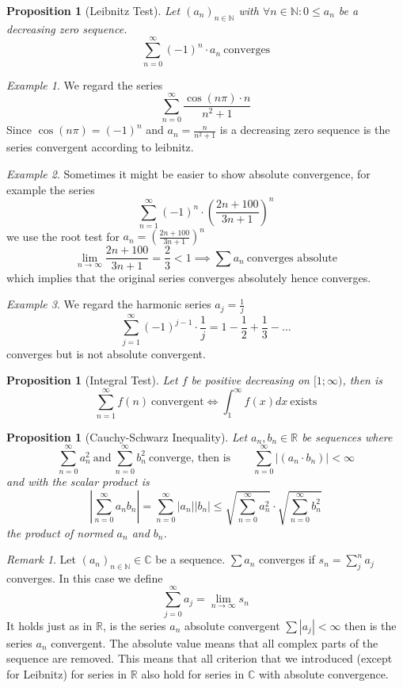 \documentclass[english,titlepage]{uzhpub}
\theoremstyle{definition}
\theoremstyle{plain}
\newtheorem{proposition}[definition]{Proposition}
\theoremstyle{remark}
\newtheorem*{remark}{Remark}
\theoremstyle{example}
\newtheorem*{example}{Example}
\begin{document}
   \begin{proposition}[Leibnitz Test]\label{pro:leibnitz}
      Let \((a_n)_{n \in \mathbb{N}}\) with \(\forall n \in \mathbb{N}: 0 \leq a_n\) be a decreasing zero sequence.
      \[\sum_{n=0}^\infty (-1)^{n} \cdot a_n~\text{converges}\]
   \end{proposition}
   \begin{example}
      We regard the series
      \[\sum_{n=0}^\infty \frac{\cos(n \pi) \cdot n}{n^2 + 1}\]
      Since \(\cos(n \pi) = (-1)^n\) and \(a_n = \frac{n}{n^2 + 1}\) is a decreasing zero sequence is the series convergent according to leibnitz.
   \end{example}
   \begin{example}
      Sometimes it might be easier to show absolute convergence, for example the series
      \[\sum_{n = 1}^\infty (-1)^n \cdot \left(\frac{2n + 100}{3n + 1}\right)^n\]
      we use the root test for \(a_n = \left(\frac{2n + 100}{3n + 1}\right)^n\)
      \[\lim_{n \to \infty} \frac{2n + 100}{3n + 1} = \frac{2}{3} < 1 \implies \sum a_n~\text{converges absolute}\]
      which implies that the original series converges absolutely hence converges.
   \end{example}
   \begin{example}
      We regard the harmonic series \(a_j = \frac{1}{j}\)
      \[\sum_{j=1}^\infty (-1)^{j-1} \cdot \frac{1}{j} = 1 - \frac{1}{2} + \frac{1}{3} - \ldots\]
      converges but is not absolute convergent.
   \end{example}

   \begin{proposition}[Integral Test]\label{pro:integral_test}
      Let \(f\) be positive decreasing on \([1; \infty)\), then is
      \[\sum_{n=1}^\infty f(n)~\text{convergent} \iff \int_1^\infty f(x) dx~\text{exists}\]
   \end{proposition}

   \begin{proposition}[Cauchy-Schwarz Inequality]\label{pro:cauchy-schwarz_ineq}
      Let \(a_n, b_n \in \mathbb{R}\) be sequences where
      \[\sum_{n=0}^\infty a_n^2~\text{and}~\sum_{n=0}^\infty b_n^2~\text{converge, then is} \qquad \sum_{n=0}^\infty |(a_n \cdot b_n)| < \infty\]
      and with the scalar product is
      \[\left|\sum_{n=0}^\infty a_nb_n\right| = \sum_{n = 0}^\infty |a_n||b_n| \leq \sqrt{\sum_{n=0}^\infty a_n^2} \cdot \sqrt{\sum_{n=0}^\infty b_n^2}\]
      the product of normed \(a_n\) and \(b_n\).
   \end{proposition}
   \begin{remark}
      Let \((a_n)_{n \in \mathbb{N}} \in \mathbb{C}\) be a sequence.
      \(\sum a_n\) converges if \(s_n = \sum_j^n a_j\) converges.
      In this case we define
      \[\sum_{j=0}^\infty a_j = \lim_{n \to \infty} s_n\]
      It holds just as in \(\mathbb{R}\), is the series \(a_n\) absolute convergent \(\sum |a_j| < \infty\) then is the series \(a_n\) convergent.
      The absolute value means that all complex parts of the sequence are removed.
      This means that all criterion that we introduced (except for Leibnitz) for series in \(\mathbb{R}\) also hold for series in \(\mathbb{C}\) with absolute convergence.
   \end{remark}
\end{document}
